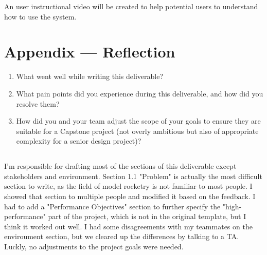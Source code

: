 \documentclass{article}
\begin{document}
An user instructional video will be created to help potential users to
understand how to use the system.

\newpage{}

\section*{Appendix --- Reflection}




\begin{enumerate}
    \item What went well while writing this deliverable?
    \item What pain points did you experience during this deliverable, and how did you
          resolve them?
    \item How did you and your team adjust the scope of your goals to ensure they are
          suitable for a Capstone project (not overly ambitious but also of appropriate
          complexity for a senior design project)?
\end{enumerate}

\subsection*{\color{blue}{Jianqing Liu}}

I'm responsible for drafting most of the sections of this deliverable except
stakeholders and environment. Section 1.1 "Problem" is actually the most
difficult section to write, as the field of model rocketry is not familiar to
most people. I showed that section to multiple people and modified it based on
the feedback. I had to add a "Performance Objectives" section to further
specify the "high-performance" part of the project, which is not in the
original template, but I think it worked out well. I had some disagreements
with my teammates on the enviroument section, but we cleared up the differences
by talking to a TA. Luckly, no adjustments to the project goals were needed.
\end{document}
